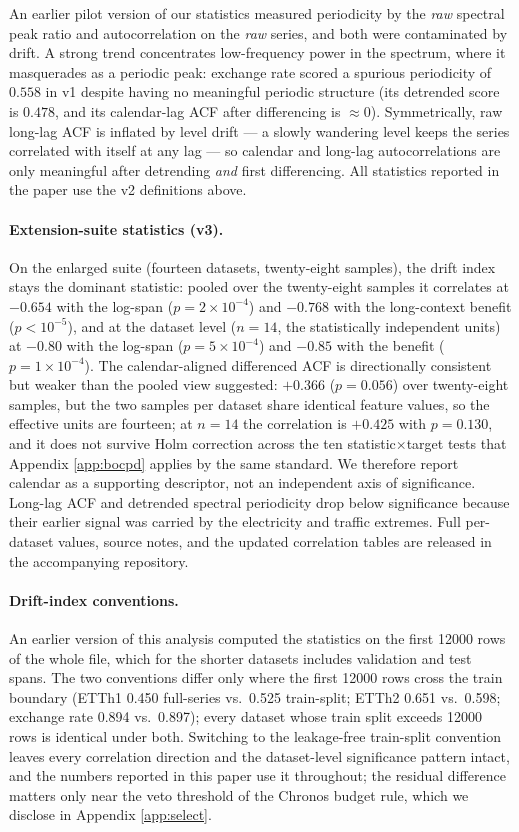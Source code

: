 An earlier pilot version of our statistics measured periodicity by the \emph{raw} spectral peak ratio and autocorrelation on the \emph{raw} series, and both were contaminated by drift. A strong trend concentrates low-frequency power in the spectrum, where it masquerades as a periodic peak: exchange rate scored a spurious periodicity of $0.558$ in v1 despite having no meaningful periodic structure (its detrended score is $0.478$, and its calendar-lag ACF after differencing is $\approx 0$). Symmetrically, raw long-lag ACF is inflated by level drift --- a slowly wandering level keeps the series correlated with itself at any lag --- so calendar and long-lag autocorrelations are only meaningful after detrending \emph{and} first differencing. All statistics reported in the paper use the v2 definitions above.

\paragraph{Extension-suite statistics (v3).}
On the enlarged suite (fourteen datasets, twenty-eight samples), the drift index stays the dominant statistic: pooled over the twenty-eight samples it correlates at $-0.654$ with the log-span ($p = 2\times10^{-4}$) and $-0.768$ with the long-context benefit ($p < 10^{-5}$), and at the dataset level ($n{=}14$, the statistically independent units) at $-0.80$ with the log-span ($p = 5\times10^{-4}$) and $-0.85$ with the benefit ($p = 1\times10^{-4}$). The calendar-aligned differenced ACF is directionally consistent but weaker than the pooled view suggested: $+0.366$ ($p=0.056$) over twenty-eight samples, but the two samples per dataset share identical feature values, so the effective units are fourteen; at $n{=}14$ the correlation is $+0.425$ with $p=0.130$, and it does not survive Holm correction across the ten statistic$\times$target tests that Appendix \ref{app:bocpd} applies by the same standard. We therefore report calendar as a supporting descriptor, not an independent axis of significance. Long-lag ACF and detrended spectral periodicity drop below significance because their earlier signal was carried by the electricity and traffic extremes. Full per-dataset values, source notes, and the updated correlation tables are released in the accompanying repository.

\paragraph{Drift-index conventions.}
An earlier version of this analysis computed the statistics on the first 12000 rows of the whole file, which for the shorter datasets includes validation and test spans. The two conventions differ only where the first 12000 rows cross the train boundary (ETTh1 0.450 full-series vs.\ 0.525 train-split; ETTh2 0.651 vs.\ 0.598; exchange rate 0.894 vs.\ 0.897); every dataset whose train split exceeds 12000 rows is identical under both. Switching to the leakage-free train-split convention leaves every correlation direction and the dataset-level significance pattern intact, and the numbers reported in this paper use it throughout; the residual difference matters only near the veto threshold of the Chronos budget rule, which we disclose in Appendix \ref{app:select}.
